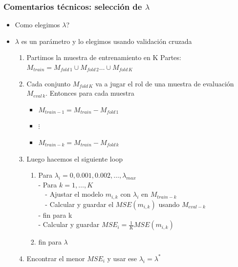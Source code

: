 \documentclass[
  shownotes,
  xcolor={svgnames},
  hyperref={colorlinks,citecolor=DarkBlue,linkcolor=DarkRed,urlcolor=DarkBlue}
  , aspectratio=169]{beamer}
\begin{document}
\begin{frame}[fragile]
\frametitle{Comentarios técnicos: selección de $\lambda$ }
\begin{itemize}
 \item Como elegimos $\lambda$?
 \item $\lambda$ es un parámetro y lo elegimos usando validación cruzada

 \begin{enumerate}
 \item Partimos la muestra de entrenamiento en K Partes: $M_{train}= M_{fold\,1} \cup M_{fold\,2} \dots \cup M_{fold\,K}$
 \item Cada conjunto  $M_{fold\,K}$ va a jugar el rol de una muestra de evaluación $M_{eval\,k}$. Entonces para cada muestra
 \begin{itemize}
  \item  $M_{train-1}=M_{train} - M_{fold\,1}$
  \item  $\vdots$
  \item  $M_{train-k}=M_{train} - M_{fold\,k}$
 \end{itemize}
 \item Luego hacemos el siguiente loop
 \begin{enumerate}
 \item Para $\lambda_i=0,0.001,0.002,\dots,\lambda_{max}$ \\
      - Para $k=1,\dots,K$ \\
      $\,\,\,\,\,\,$- Ajustar el modelo $m_{i,k}$ con $\lambda_i$ en $M_{train-k}$ \\
      $\,\,\,\,\,\,$- Calcular y guardar el $MSE(m_{i,k})$ usando $M_{eval-k}$ \\
      - fin para k \\
      - Calcular y guardar $MSE_i=\frac{1}{K} MSE(m_{i,k})$ \\
\item fin para $\lambda$
 \end{enumerate}
 \item Encontrar el menor $MSE_i$ y usar ese $\lambda_i=\lambda^*$
  \end{enumerate}
\end{itemize}

\end{frame}


\end{document}
